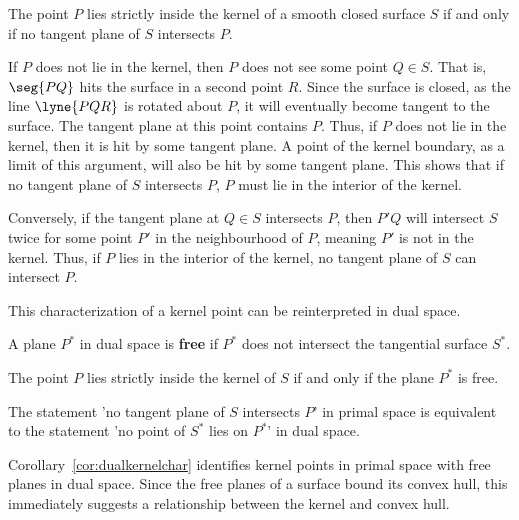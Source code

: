 \documentclass[12pt]{article}
\begin{document}
\begin{lemma}
\label{lem:primalkernelchar}
The point $P$ lies strictly inside the kernel of a smooth closed surface $S$ if and only if 
no tangent plane of $S$ intersects $P$.
\end{lemma}
\prf
If $P$ does not lie in the kernel,
then $P$ does not see some point $Q \in S$.
That is, $\seg{PQ}$ hits the surface in a second point $R$.
Since the surface is closed, 
as the line $\lyne{PQR}$ is rotated about $P$,
it will eventually become tangent to the surface.
The tangent plane at this point contains $P$.
Thus, if $P$ does not lie in the kernel, then it is hit by some tangent plane.
A point of the kernel boundary, as a limit of this argument, will also be hit by some tangent plane.
This shows that if no tangent plane of $S$ intersects $P$, 
$P$ must lie in the interior of the kernel.

Conversely, if the tangent plane at $Q \in S$ intersects $P$, then $P'Q$ will intersect $S$ twice for some point $P'$ in 
the neighbourhood of $P$, meaning $P'$ is not in the kernel.
Thus, if $P$ lies in the interior of the kernel, no tangent plane of $S$ can intersect $P$.
\QED


\noindent This characterization of a kernel point can be reinterpreted in dual space.

\begin{defn2}
A plane $P^*$ in dual space is {\bf free} if $P^*$ does not intersect the tangential surface $S^*$.
\end{defn2}

\begin{corollary}
\label{cor:dualkernelchar}
The point $P$ lies strictly inside the kernel of $S$ if and only if 
the plane $P^*$ is free.
\end{corollary}
\prf
The statement 'no tangent plane of $S$ intersects $P$' in primal space
is equivalent to the statement 'no point of $S^*$ lies on $P^*$' in dual space.
\QED

Corollary~\ref{cor:dualkernelchar} identifies kernel points in primal space
with free planes in dual space.
Since the free planes of a surface bound its convex hull,
this immediately suggests a relationship between the kernel and convex hull.
\end{document}
